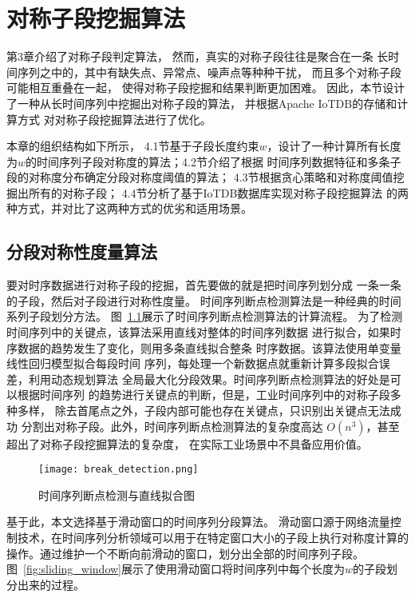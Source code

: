 
\chapter{对称子段挖掘算法}
第3章介绍了对称子段判定算法，
然而，真实的对称子段往往是聚合在一条
长时间序列之中的，其中有缺失点、异常点、噪声点等种种干扰，
而且多个对称子段可能相互重叠在一起，
使得对称子段挖掘和结果判断更加困难。
因此，本节设计了一种从长时间序列中挖掘出对称子段的算法，
并根据Apache IoTDB的存储和计算方式
对对称子段挖掘算法进行了优化。

本章的组织结构如下所示，
4.1节基于子段长度约束$w$，设计了一种计算所有长度
为$w$的时间序列子段对称度的算法；4.2节介绍了根据
时间序列数据特征和多条子段的对称度分布确定分段对称度阈值的算法；
4.3节根据贪心策略和对称度阈值挖掘出所有的对称子段；
4.4节分析了基于IoTDB数据库实现对称子段挖掘算法
的两种方式，并对比了这两种方式的优劣和适用场景。

\section{分段对称性度量算法}
要对时序数据进行对称子段的挖掘，首先要做的就是把时间序列划分成
一条一条的子段，然后对子段进行对称性度量。
时间序列断点检测算法是一种经典的时间系列子段划分方法\cite{DBLP:conf/igarss/UrbanHZMGBMMFRH21}。
图~\ref{fig:break_detection}展示了时间序列断点检测算法的计算流程。
为了检测时间序列中的关键点，该算法采用直线对整体的时间序列数据
进行拟合，如果时序数据的趋势发生了变化，则用多条直线拟合整条
时序数据。该算法使用单变量线性回归模型拟合每段时间
序列，每处理一个新数据点就重新计算多段拟合误差，利用动态规划算法
全局最大化分段效果。时间序列断点检测算法的好处是可以根据时间序列
的趋势进行关键点的判断，但是，工业时间序列中的对称子段多种多样，
除去首尾点之外，子段内部可能也存在关键点，只识别出关键点无法成功
分割出对称子段。此外，时间序列断点检测算法的复杂度高达
$O\left(n^{3}\right)$，甚至超出了对称子段挖掘算法的复杂度，
在实际工业场景中不具备应用价值。
\begin{figure}
  \centering
  \texttt{[image: break\_detection.png]}
  \caption{时间序列断点检测与直线拟合图}
  \label{fig:break_detection}
\end{figure}

基于此，本文选择基于滑动窗口的时间序列分段算法\cite{DBLP:conf/pkdd/LestiS17}。
滑动窗口源于网络流量控制技术，在时间序列分析领域可以用于在特定窗口大小的子段上执行对称度计算的
操作。通过维护一个不断向前滑动的窗口，划分出全部的时间序列子段。
图~\ref{fig:sliding_window}展示了使用滑动窗口将时间序列中每个长度为$w$的子段划分出来的过程。

